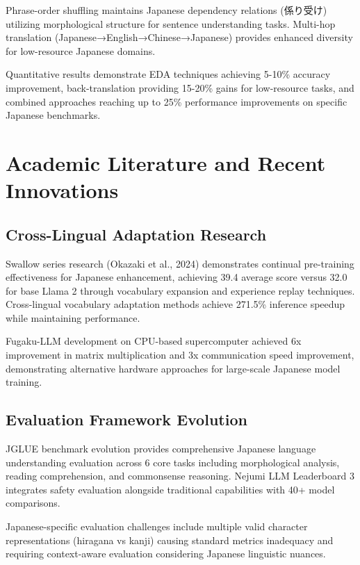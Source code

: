 \documentclass[11pt,a4paper]{article}
\begin{document}
Phrase-order shuffling maintains Japanese dependency relations (係り受け) utilizing morphological structure for sentence understanding tasks. Multi-hop translation (Japanese→English→Chinese→Japanese) provides enhanced diversity for low-resource Japanese domains.

Quantitative results demonstrate EDA techniques achieving 5-10\% accuracy improvement, back-translation providing 15-20\% gains for low-resource tasks, and combined approaches reaching up to 25\% performance improvements on specific Japanese benchmarks.

\section{Academic Literature and Recent Innovations}

\subsection{Cross-Lingual Adaptation Research}

Swallow series research (Okazaki et al., 2024) demonstrates continual pre-training effectiveness for Japanese enhancement, achieving 39.4 average score versus 32.0 for base Llama 2 through vocabulary expansion and experience replay techniques. Cross-lingual vocabulary adaptation methods achieve 271.5\% inference speedup while maintaining performance.

Fugaku-LLM development on CPU-based supercomputer achieved 6x improvement in matrix multiplication and 3x communication speed improvement, demonstrating alternative hardware approaches for large-scale Japanese model training.

\subsection{Evaluation Framework Evolution}

JGLUE benchmark evolution provides comprehensive Japanese language understanding evaluation across 6 core tasks including morphological analysis, reading comprehension, and commonsense reasoning. Nejumi LLM Leaderboard 3 integrates safety evaluation alongside traditional capabilities with 40+ model comparisons.

Japanese-specific evaluation challenges include multiple valid character representations (hiragana vs kanji) causing standard metrics inadequacy and requiring context-aware evaluation considering Japanese linguistic nuances.
\end{document}
